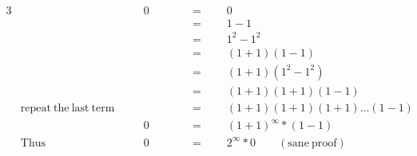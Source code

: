 \begin{alignat*}{3}
&\,&&\quad0\qquad&&=\qquad0\\
&\,&&\,&&=\qquad1-1\\
&\,&&\,&&=\qquad1^2-1^2\\
&\,&&\,&&=\qquad(1+1)(1-1)\\
&\,&&\,&&=\qquad(1+1)(1^2-1^2)\\
&\,&&\,&&=\qquad(1+1)(1+1)(1-1)\\
&\mathrm{repeat~the~last~term}&&\quad&&=\qquad(1+1)(1+1)(1+1)...(1-1)\\
&\,&&\quad0&&=\qquad(1+1)^\infty*(1-1)\\
&\mathrm{Thus}\,&&\quad0&&=\qquad2^\infty*0\qquad\mathrm{(sane~proof)}\\
\end{alignat*}
